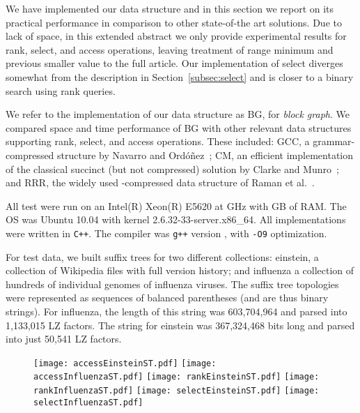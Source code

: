 \documentclass[12pt]{article}
\begin{document}
{We have implemented our data structure and in this section we report on its
practical performance in comparison to other state-of-the art solutions. Due 
to lack of space, in this extended abstract we only provide experimental results 
for rank, select, and access operations, leaving treatment of range minimum 
and previous smaller value to the full article. Our implementation of select
diverges somewhat from the description in Section~\ref{subsec:select} and is 
closer to a binary search using rank queries.

We refer to the implementation of our data 
structure as BG, for {\em block graph}. We compared space and time performance 
of BG with other relevant data structures supporting rank, select, and access
operations. These included: GCC, a grammar-compressed structure by
Navarro and Ord\'o\~{n}ez~\cite{NO14}; CM, an efficient implementation of the classical 
succinct (but not compressed) solution by Clarke and Munro~\cite{Mun96}; and RRR, the 
widely used -compressed data structure of Raman et al.~\cite{RRR07}. 

All test were run on an Intel(R) Xeon(R) E5620 at GHz with GB of RAM. 
The OS was Ubuntu 10.04 with kernel 2.6.32-33-server.x86\_64. All implementations 
were written in {\tt C++}. The compiler was \verb|g++| version , with \verb|-O9| 
optimization.

For test data, we built suffix trees for two different collections: {\sf einstein},
a collection of Wikipedia files with full version history; and {\sf influenza} a 
collection of hundreds of individual genomes of influenza viruses. The suffix tree topologies
were represented as sequences of balanced parentheses (and are thus binary strings). For {\sf influenza}, the 
length of this string was 603,704,964 and parsed into 1,133,015 LZ factors. 
The string for {\sf einstein} was 367,324,468 bits long and parsed into just 50,541
LZ factors.

\begin{figure}[htb]
  \texttt{[image: accessEinsteinST.pdf]}
\endminipage\hfill
{}
  \texttt{[image: accessInfluenzaST.pdf]}
\endminipage
\vspace{1ex}
\newline
{}
  \texttt{[image: rankEinsteinST.pdf]}
\endminipage\hfill
{}
  \texttt{[image: rankInfluenzaST.pdf]}
\endminipage
\vspace{1ex}
\newline
{}
  \texttt{[image: selectEinsteinST.pdf]}
\endminipage\hfill
{}
  \texttt{[image: selectInfluenzaST.pdf]}
\endminipage


\end{figure}}
\end{document}
